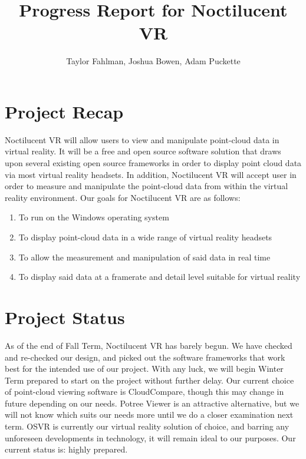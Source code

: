 \documentclass{article}
\begin{document}
\title {Progress Report for Noctilucent VR}
\author {Taylor Fahlman, Joshua Bowen, Adam Puckette}

\maketitle

\section{Project Recap}

Noctilucent VR will allow users to view and manipulate point-cloud data in virtual reality. 
It will be a free and open source software solution that draws upon several existing open source frameworks in order to display point cloud data via most virtual reality headsets. 
In addition, Noctilucent VR will accept user in order to measure and manipulate the point-cloud data from within the virtual reality environment. 
Our goals for Noctilucent VR are as follows:

\begin{enumerate}
\item To run on the Windows operating system
\item To display point-cloud data in a wide range of virtual reality headsets
\item To allow the measurement and manipulation of said data in real time
\item To display said data at a framerate and detail level suitable for virtual reality
\end{enumerate}

\section{Project Status}


As of the end of Fall Term, Noctilucent VR has barely begun. 
We have checked and re-checked our design, and picked out the software frameworks that work best for the intended use of our project. 
With any luck, we will begin Winter Term prepared to start on the project without further delay. 
Our current choice of point-cloud viewing software is CloudCompare, though this may change in future depending on our needs. 
Potree Viewer is an attractive alternative, but we will not know which suits our needs more until we do a closer examination next term. 
OSVR is currently our virtual reality solution of choice, and barring any unforeseen developments in technology, it will remain ideal to our purposes. 
Our current status is: highly prepared.
\end{document}
